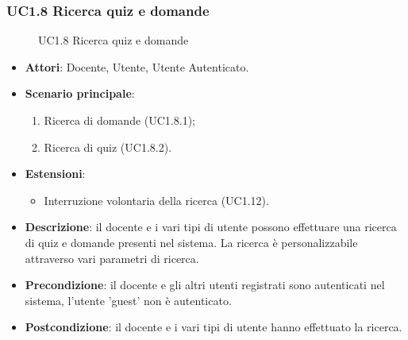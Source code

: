 \subsubsection{UC1.8 Ricerca quiz e domande}
\begin{figure}[H]
\centering
\noindent{}
\caption{UC1.8 Ricerca quiz e domande}
\end{figure}
\begin{itemize}
\item \textbf{Attori}: Docente, Utente, Utente Autenticato.
\item \textbf{Scenario principale}:
\begin{enumerate}
\item Ricerca di domande (UC1.8.1);
\item Ricerca di quiz (UC1.8.2).
\end{enumerate}
\item \textbf{Estensioni}:
\begin{itemize}
\item Interruzione volontaria della ricerca (UC1.12).
\end{itemize}
\item \textbf{Descrizione}: il docente e i vari tipi di utente possono effettuare una ricerca di quiz e domande presenti nel sistema. La ricerca è personalizzabile attraverso vari parametri di ricerca.
\item \textbf{Precondizione}: il docente e gli altri utenti registrati sono autenticati nel sistema, l'utente 'guest' non è autenticato.
\item \textbf{Postcondizione}: il docente e i vari tipi di utente hanno effettuato la ricerca.
\end{itemize}
